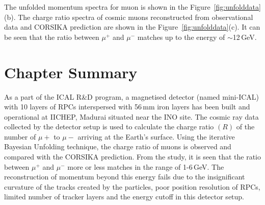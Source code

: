The unfolded momentum spectra for muon is shown in the
Figure~\ref{fig:unfolddata}(b). The charge ratio spectra of cosmic
muons reconstructed from observational data and CORSIKA prediction
are shown in the Figure~\ref{fig:unfolddata}(c). It can be seen that
the ratio between $\mu^{+}$ and $\mu^{-}$ matches up to the energy
of $\sim$12\,GeV.

\section{Chapter Summary}
As a part of the ICAL R\&D program, a magnetised detector
(named mini-ICAL) with 10 layers of RPCs interspersed with 56\,mm iron
layers has been built and operational at IICHEP, Madurai situated
near the INO site. The cosmic ray data collected by the detector
setup is used to calculate the charge ratio $(R)$ of the number
of $\mu+$ to $\mu-$ arriving at the Earth's surface.
Using the iterative Bayesian Unfolding technique, the charge ratio
of muons is observed and compared with the CORSIKA prediction.
From the study, it is seen that the ratio between $\mu^{+}$ and
$\mu^{-}$ more or less matches in the range of 1-6\,GeV.
The reconstruction of momentum beyond this energy fails due to the
insignificant curvature of the tracks created by the particles, poor
position resolution of RPCs, limited number of tracker layers and
the energy cutoff in this detector setup.
